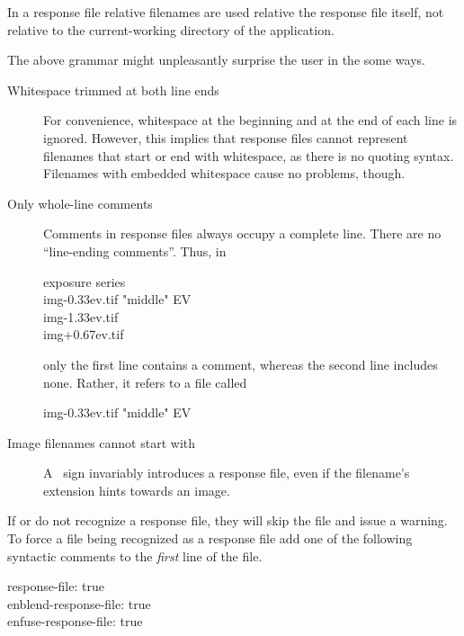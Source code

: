 In a response file relative filenames are used relative the response
file itself, not relative to the current-working directory of the
application.

The above grammar might unpleasantly surprise the user in the
some ways.

\begin{description}
\item[Whitespace trimmed at both line ends]\itemend For convenience,
  whitespace at the beginning and at the end of each line is ignored.
  However, this implies that response files cannot represent filenames
  that start or end with whitespace, as there is no quoting syntax.
  Filenames with embedded whitespace cause no problems, though.

\item[Only whole-line comments]\itemend Comments in response files
  always occupy a complete line.  There are no ``line-ending
  comments''.  Thus, in

  \begin{literal}
     exposure series \\
    img-0.33ev.tif  "middle" EV \\
    img-1.33ev.tif \\
    img+0.67ev.tif \\
  \end{literal}

  only the first line contains a comment, whereas the second line
  includes none.  Rather, it refers to a file called
  \begin{literal}
    img-0.33ev.tif  "middle" EV
  \end{literal}

\item[Image filenames cannot start with
  ]\itemend A
  ~sign invariably
  introduces a response file, even if the filename's extension hints
  towards an image.
\end{description}

If  or  do not recognize a
response file, they will skip the file and issue a warning.  To
force a file being
recognized as a response file add one of the following syntactic
comments to the \emph{first} line of the file.

\begin{literal}
  response-file: true \\
  enblend-response-file: true \\
  enfuse-response-file: true \\
\end{literal}

